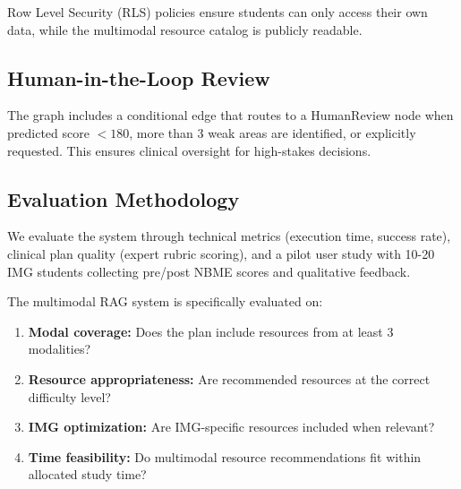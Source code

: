 Row Level Security (RLS) policies ensure students can only access their own data, while the multimodal resource catalog is publicly readable.

\subsection{Human-in-the-Loop Review}

The graph includes a conditional edge that routes to a HumanReview node when predicted score $< 180$, more than 3 weak areas are identified, or explicitly requested. This ensures clinical oversight for high-stakes decisions.

\subsection{Evaluation Methodology}

We evaluate the system through technical metrics (execution time, success rate), clinical plan quality (expert rubric scoring), and a pilot user study with 10-20 IMG students collecting pre/post NBME scores and qualitative feedback.

The multimodal RAG system is specifically evaluated on:
\begin{enumerate}
    \item \textbf{Modal coverage:} Does the plan include resources from at least 3 modalities?
    \item \textbf{Resource appropriateness:} Are recommended resources at the correct difficulty level?
    \item \textbf{IMG optimization:} Are IMG-specific resources included when relevant?
    \item \textbf{Time feasibility:} Do multimodal resource recommendations fit within allocated study time?
\end{enumerate}

